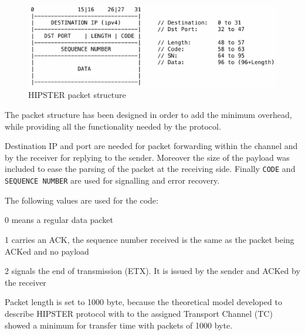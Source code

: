 \documentclass[10pt,twocolumn]{article}
\begin{document}
\begin{figure}[htp]
	\centering
    \includegraphics[width=0.95\columnwidth]{tex/images/packet_structure.pdf}
	\caption{HIPSTER packet structure}
	\label{fig:header}
\end{figure}
The packet structure has been designed in order to add the minimum overhead,
while providing all the functionality needed by the protocol.

Destination IP and port are needed for packet forwarding within the channel
and by the receiver for replying to the sender. Moreover the size of the
payload was included to ease the parsing of the packet at the receiving side.
Finally \texttt{CODE} and \texttt{SEQUENCE NUMBER} are used for signalling
and error recovery.

The following values are used for the code:
\begin{compactitem}
\item 0 means a regular data packet
\item 1 carries an ACK, the sequence number received is the same as the packet
	being ACKed and no payload
\item 2 signals the end of transmission (ETX). It is issued by the sender and
	ACKed by the receiver
\end{compactitem}

Packet length is set to 1000 byte, because the theoretical model developed to describe HIPSTER protocol with to the assigned Transport Channel (TC) showed a minimum for transfer time with packets of 1000 byte. \\
\end{document}
